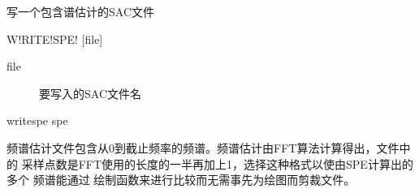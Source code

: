 \label{spe:writespe}

写一个包含谱估计的SAC文件

\begin{SACSTX}
W!RITE!SPE! [file]
\end{SACSTX}

\begin{description}
\item [file] 要写入的SAC文件名
\end{description}

\begin{SACDFT}
writespe spe
\end{SACDFT}

频谱估计文件包含从0到截止频率的频谱。频谱估计由FFT算法计算得出，文件中的
采样点数是FFT使用的长度的一半再加上1，选择这种格式以使由SPE计算出的多个
频谱能通过  绘制函数来进行比较而无需事先为绘图而剪裁文件。
